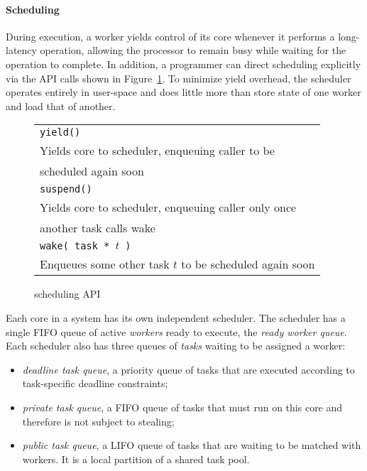 \paragraph{Scheduling} During execution, a worker yields control of its core
whenever it performs a long-latency operation, allowing the processor to
remain busy while waiting for the operation to complete. In addition, a
programmer can direct scheduling explicitly via the \Grappa API calls shown in
Figure~\ref{fig:scheduling}. To minimize yield overhead, the \Grappa scheduler
operates entirely in user-space and does little more than store state of one
worker and load that of another.

\begin{figure}[htbp]
  \begin{center}
	\begin{tabular}{l}
    \texttt{\scriptsize yield() } \\
      Yields core to scheduler, enqueuing caller to be \\ scheduled again soon \\
    \texttt{\scriptsize suspend() }  \\
      Yields core to scheduler, enqueuing caller only once \\ another task calls wake \\
    \texttt{\scriptsize wake( task * $t$ ) } \\
      Enqueues some other task $t$ to be scheduled again soon \\
	\end{tabular}
    \begin{minipage}{0.95\columnwidth}
      \caption{\label{fig:scheduling} \Grappa scheduling API } 
    \end{minipage}
  \end{center}
\end{figure}

Each core in a \Grappa system has its own independent scheduler. The scheduler
has a single FIFO queue of active \emph{workers} ready to execute, the {\it
ready worker queue}. Each scheduler also has three queues of \emph{tasks}
waiting to be assigned a worker:

\begin{itemize}

\item {\it deadline task queue}, a priority queue of tasks that are executed according to task-specific deadline constraints;

\item {\it private task queue}, a FIFO queue of tasks that must run on
this core and therefore is not subject to stealing;

\item {\it public task queue},  a LIFO queue of tasks that are
  waiting to be matched with workers. It is a local partition of a shared
  task pool.

\end{itemize}


